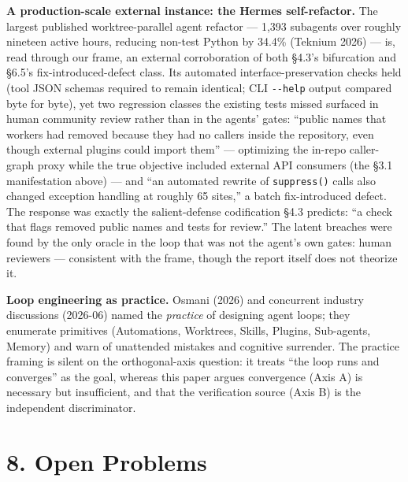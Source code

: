 \documentclass[
  11pt,
]{article}
\begin{document}
\textbf{A production-scale external instance: the Hermes self-refactor.}
The largest published worktree-parallel agent refactor --- 1,393
subagents over roughly nineteen active hours, reducing non-test Python
by 34.4\% (Teknium 2026) --- is, read through our frame, an external
corroboration of both §4.3's bifurcation and §6.5's
fix-introduced-defect class. Its automated interface-preservation checks
held (tool JSON schemas required to remain identical; CLI
\texttt{-\/-help} output compared byte for byte), yet two regression
classes the existing tests missed surfaced in human community review
rather than in the agents' gates: ``public names that workers had
removed because they had no callers inside the repository, even though
external plugins could import them'' --- optimizing the in-repo
caller-graph proxy while the true objective included external API
consumers (the §3.1 manifestation above) --- and ``an automated rewrite
of \texttt{suppress()} calls also changed exception handling at roughly
65 sites,'' a batch fix-introduced defect. The response was exactly the
salient-defense codification §4.3 predicts: ``a check that flags removed
public names and tests for review.'' The latent breaches were found by
the only oracle in the loop that was not the agent's own gates: human
reviewers --- consistent with the frame, though the report itself does
not theorize it.

\textbf{Loop engineering as practice.} Osmani (2026) and concurrent
industry discussions (2026-06) named the \emph{practice} of designing
agent loops; they enumerate primitives (Automations, Worktrees, Skills,
Plugins, Sub-agents, Memory) and warn of unattended mistakes and
cognitive surrender. The practice framing is silent on the
orthogonal-axis question: it treats ``the loop runs and converges'' as
the goal, whereas this paper argues convergence (Axis A) is necessary
but insufficient, and that the verification source (Axis B) is the
independent discriminator.

\section{8. Open Problems}\label{open-problems}
\end{document}
